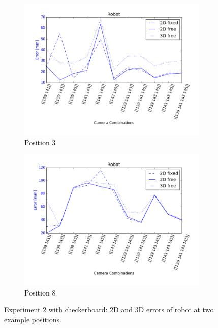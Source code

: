\begin{figure}
    \centering
    \begin{subfigure}{0.49\linewidth}
        \includegraphics[width=\textwidth]{files/res3_err3}
        \caption{Position 3}
        \label{fig:res3_err3}
    \end{subfigure}
    \begin{subfigure}{0.49\linewidth}
        \includegraphics[width=\textwidth]{files/res3_err8}
        \caption{Position 8}
        \label{fig:res3_err8}
    \end{subfigure}
    \caption{Experiment 2 with checkerboard: 2D and 3D errors of robot at two example positions.}
    \label{fig:res3_errors}
\end{figure}


